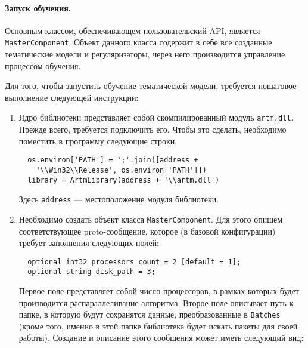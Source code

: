 \paragraph{Запуск обучения.} Основным классом, обеспечивающем пользовательский API, является \verb|MasterComponent|. Объект данного класса содержит в себе все созданные тематические модели и регуляризаторы, через него производится управление процессом обучения. 

Для того, чтобы запустить обучение тематической модели, требуется пошаговое выполнение следующей инструкции:

\begin{enumerate}
	\item Ядро библиотеки представляет собой скомпилированный модуль \verb|artm.dll|. Прежде всего, требуется подключить его. Чтобы это сделать, необходимо поместить в программу следующие строки:
	
	\vspace{5pt}
	
	\verb|  os.environ['PATH'] = ';'.join([address + | \\
	\verb|    '\\Win32\\Release', os.environ['PATH']])| \\
	\verb|  library = ArtmLibrary(address + '\\artm.dll')|
	
	\vspace{5pt}
	
	Здесь \verb|address| --- местоположение модуля библиотеки.
	
	\item Необходимо создать объект класса \verb|MasterComponent|. Для этого опишем соответствующее proto-сообщение, которое (в базовой конфигурации) требует заполнения следующих полей:
	
	\vspace{5pt}
	
	\verb|  optional int32 processors_count = 2 [default = 1];| \\
	\verb|  optional string disk_path = 3;|
	
	\vspace{5pt}
	
	Первое поле представляет собой число процессоров, в рамках которых будет производится распараллеливание алгоритма. Второе поле описывает путь к папке, в которую будут сохранятся данные, преобразованные в \verb|Batches| (кроме того, именно в этой папке библиотека будет искать пакеты для своей работы). Создание и описание этого сообщения может иметь следующий вид:
	

\end{enumerate}
